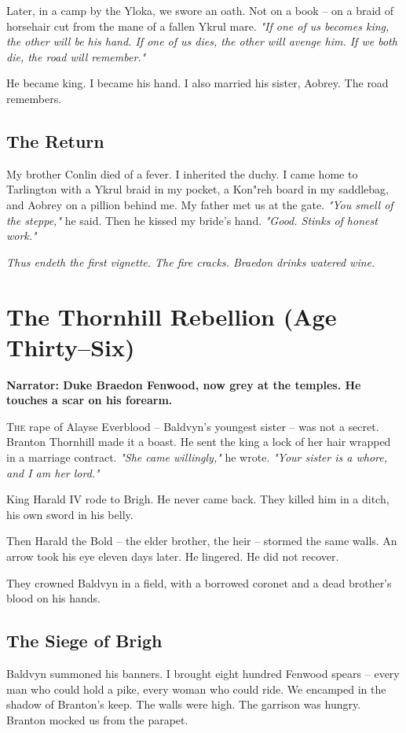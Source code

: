 \documentclass[11pt]{book}
\begin{document}
Later, in a camp by the Yloka, we swore an oath. Not on a book -- on a braid of horsehair cut from the mane of a fallen Ykrul mare. \textit{"If one of us becomes king, the other will be his hand. If one of us dies, the other will avenge him. If we both die, the road will remember."}

He became king. I became his hand. I also married his sister, Aobrey. The road remembers.

\section*{The Return}
My brother Conlin died of a fever. I inherited the duchy. I came home to Tarlington with a Ykrul braid in my pocket, a Kon"reh board in my saddlebag, and Aobrey on a pillion behind me. My father met us at the gate. \textit{"You smell of the steppe,"} he said. Then he kissed my bride's hand. \textit{"Good. Stinks of honest work."}

\vspace{1em}
\noindent\textit{Thus endeth the first vignette. The fire cracks. Braedon drinks watered wine.}

\clearpage

\chapter{The Thornhill Rebellion (Age Thirty--Six)}

\textbf{Narrator: Duke Braedon Fenwood, now grey at the temples. He touches a scar on his forearm.}

\lettrine{T}{he} rape of Alayse Everblood -- Baldvyn's youngest sister -- was not a secret. Branton Thornhill made it a boast. He sent the king a lock of her hair wrapped in a marriage contract. \textit{"She came willingly,"} he wrote. \textit{"Your sister is a whore, and I am her lord."}

King Harald IV rode to Brigh. He never came back. They killed him in a ditch, his own sword in his belly.

Then Harald the Bold -- the elder brother, the heir -- stormed the same walls. An arrow took his eye eleven days later. He lingered. He did not recover.

They crowned Baldvyn in a field, with a borrowed coronet and a dead brother's blood on his hands.

\section*{The Siege of Brigh}
Baldvyn summoned his banners. I brought eight hundred Fenwood spears -- every man who could hold a pike, every woman who could ride. We encamped in the shadow of Branton's keep. The walls were high. The garrison was hungry. Branton mocked us from the parapet.
\end{document}
